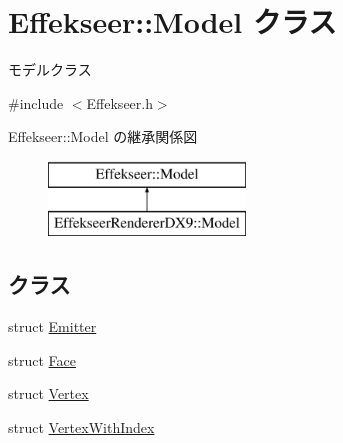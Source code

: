 \hypertarget{class_effekseer_1_1_model}{}\section{Effekseer\+:\+:Model クラス}
\label{class_effekseer_1_1_model}


モデルクラス  




{\ttfamily \#include $<$Effekseer.\+h$>$}

Effekseer\+:\+:Model の継承関係図\begin{figure}[H]
\begin{center}
\leavevmode
\includegraphics[height=2.000000cm]{class_effekseer_1_1_model}
\end{center}
\end{figure}
\subsection*{クラス}
\begin{DoxyCompactItemize}
\item 
struct \mbox{\hyperlink{struct_effekseer_1_1_model_1_1_emitter}{Emitter}}
\item 
struct \mbox{\hyperlink{struct_effekseer_1_1_model_1_1_face}{Face}}
\item 
struct \mbox{\hyperlink{struct_effekseer_1_1_model_1_1_vertex}{Vertex}}
\item 
struct \mbox{\hyperlink{struct_effekseer_1_1_model_1_1_vertex_with_index}{Vertex\+With\+Index}}
\end{DoxyCompactItemize}
